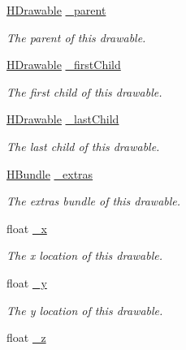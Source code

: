 \begin{DoxyCompactItemize}
\item 
\hyperlink{classhype_1_1drawable_1_1_h_drawable}{H\-Drawable} \hyperlink{classhype_1_1drawable_1_1_h_drawable_a1f95d00444c6964efa4239ddf135a10e}{\-\_\-parent}
\begin{DoxyCompactList}\small\item\em The parent of this drawable. \end{DoxyCompactList}\item 
\hyperlink{classhype_1_1drawable_1_1_h_drawable}{H\-Drawable} \hyperlink{classhype_1_1drawable_1_1_h_drawable_a69d5c4b696ca07da01e245a88348962d}{\-\_\-first\-Child}
\begin{DoxyCompactList}\small\item\em The first child of this drawable. \end{DoxyCompactList}\item 
\hyperlink{classhype_1_1drawable_1_1_h_drawable}{H\-Drawable} \hyperlink{classhype_1_1drawable_1_1_h_drawable_a913a87558ada09b12cbe57fd88ecdd10}{\-\_\-last\-Child}
\begin{DoxyCompactList}\small\item\em The last child of this drawable. \end{DoxyCompactList}\item 
\hyperlink{classhype_1_1util_1_1_h_bundle}{H\-Bundle} \hyperlink{classhype_1_1drawable_1_1_h_drawable_a77a64d01b7766ad4d0e338f82ab23f12}{\-\_\-extras}
\begin{DoxyCompactList}\small\item\em The extras bundle of this drawable. \end{DoxyCompactList}\item 
float \hyperlink{classhype_1_1drawable_1_1_h_drawable_a20c0ae16de46b74c903667ac2db1640a}{\-\_\-x}
\begin{DoxyCompactList}\small\item\em The x location of this drawable. \end{DoxyCompactList}\item 
float \hyperlink{classhype_1_1drawable_1_1_h_drawable_a42f6ddcf3b67293eab4d61d08eccbd5c}{\-\_\-y}
\begin{DoxyCompactList}\small\item\em The y location of this drawable. \end{DoxyCompactList}\item 
float \hyperlink{classhype_1_1drawable_1_1_h_drawable_a3d0f13d023b008b211fdb60a87ade649}{\-\_\-z}

\end{DoxyCompactItemize}
